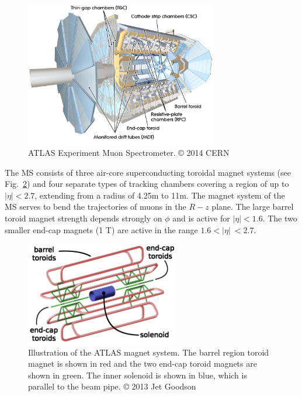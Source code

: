 \begin{figure}
	\centering
	\includegraphics[width=0.75\textwidth]{muon_subsystem}
	\caption{ATLAS Experiment Muon Spectrometer. © 2014 CERN}
	\label{fig:muon_spectrometer_cutout}
\end{figure}

The MS consists of three air-core superconducting toroidal magnet systems (see Fig.~\ref{fig:ATLAS_magnet_system}) and four separate types of tracking chambers covering a region of up to $|\eta| < 2.7$, extending from a radius of 4.25m to 11m.
The magnet system of the MS serves to bend the trajectories of muons in the $R-z$ plane.
The large barrel toroid magnet strength depends strongly on $\phi$ and is active for $|\eta| < 1.6$.
The two smaller end-cap magnets (1 T) are active in the range $1.6 < |\eta|\ < 2.7$.

\begin{figure}
	\centering
	\includegraphics[width=0.6\textwidth]{magnet_systems}
	\caption{Illustration of the ATLAS magnet system. \cite{CERN-LHCC-97-018}
	The barrel region toroid magnet is shown in red and the two end-cap toroid magnets are shown in green. The inner solenoid is shown in blue, which is parallel to the beam pipe. © 2013 Jet Goodson}
	
	\label{fig:ATLAS_magnet_system}
\end{figure}

